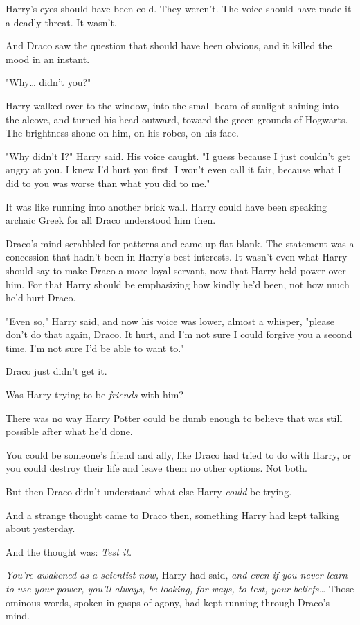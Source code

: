 Harry's eyes should have been cold. They weren't. The voice should have made it 
a deadly threat. It wasn't.

And Draco saw the question that should have been obvious, and it killed the 
mood in an instant.

"Why{\ldots} didn't you?"

Harry walked over to the window, into the small beam of sunlight shining into 
the alcove, and turned his head outward, toward the green grounds of Hogwarts. 
The brightness shone on him, on his robes, on his face.

"Why didn't I?" Harry said. His voice caught. "I guess because I just couldn't 
get angry at you. I knew I'd hurt you first. I won't even call it fair, because 
what I did to you was worse than what you did to me."

It was like running into another brick wall. Harry could have been speaking 
archaic Greek for all Draco understood him then.

Draco's mind scrabbled for patterns and came up flat blank. The statement was a 
concession that hadn't been in Harry's best interests. It wasn't even what 
Harry should say to make Draco a more loyal servant, now that Harry held power 
over him. For that Harry should be emphasizing how kindly he'd been, not how 
much he'd hurt Draco.

"Even so," Harry said, and now his voice was lower, almost a whisper, "please 
don't do that again, Draco. It hurt, and I'm not sure I could forgive you a 
second time. I'm not sure I'd be able to want to."

Draco just didn't get it.

Was Harry trying to be \emph{friends} with him?

There was no way Harry Potter could be dumb enough to believe that was still 
possible after what he'd done.

You could be someone's friend and ally, like Draco had tried to do with Harry, 
or you could destroy their life and leave them no other options. Not both.

But then Draco didn't understand what else Harry \emph{could} be trying.

And a strange thought came to Draco then, something Harry had kept talking 
about yesterday.

And the thought was: \emph{Test it.}

\emph{You're awakened as a scientist now,} Harry had said, \emph{and even if 
you never learn to use your power, you'll always, be looking, for ways, to 
test, your beliefs{\ldots}} Those ominous words, spoken in gasps of agony, had 
kept running through Draco's mind.


